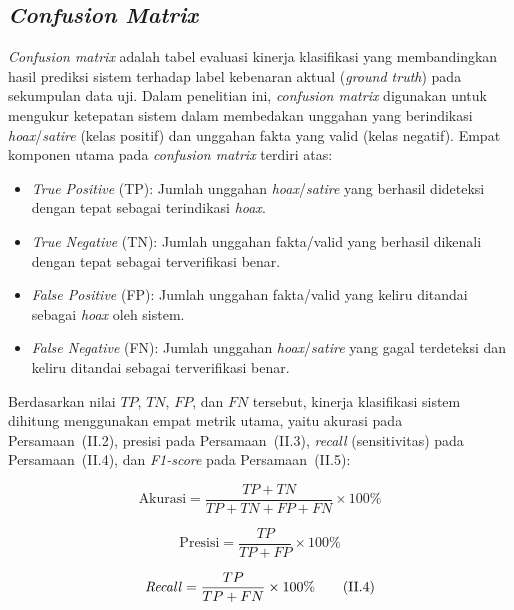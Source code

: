 \documentclass[12pt,a4paper,twoside]{report}
\begin{document}
\subsection{\textit{Confusion Matrix}}

\textit{Confusion matrix} adalah tabel evaluasi kinerja klasifikasi yang membandingkan hasil prediksi sistem terhadap label kebenaran aktual (\textit{ground truth}) pada sekumpulan data uji. Dalam penelitian ini, \textit{confusion matrix} digunakan untuk mengukur ketepatan sistem dalam membedakan unggahan yang berindikasi \textit{hoax}/\textit{satire} (kelas positif) dan unggahan fakta yang valid (kelas negatif). Empat komponen utama pada \textit{confusion matrix} terdiri atas:
\begin{itemize}[leftmargin=0.8cm,itemsep=2pt,topsep=2pt]
  \item \textit{True Positive} (TP): Jumlah unggahan \textit{hoax}/\textit{satire} yang berhasil dideteksi dengan tepat sebagai terindikasi \textit{hoax}.
  \item \textit{True Negative} (TN): Jumlah unggahan fakta/valid yang berhasil dikenali dengan tepat sebagai terverifikasi benar.
  \item \textit{False Positive} (FP): Jumlah unggahan fakta/valid yang keliru ditandai sebagai \textit{hoax} oleh sistem.
  \item \textit{False Negative} (FN): Jumlah unggahan \textit{hoax}/\textit{satire} yang gagal terdeteksi dan keliru ditandai sebagai terverifikasi benar.
\end{itemize}

Berdasarkan nilai $TP$, $TN$, $FP$, dan $FN$ tersebut, kinerja klasifikasi sistem dihitung menggunakan empat metrik utama, yaitu akurasi pada Persamaan~(II.2), presisi pada Persamaan~(II.3), \textit{recall} (sensitivitas) pada Persamaan~(II.4), dan \textit{F1-score} pada Persamaan~(II.5):

\begin{equation}
  \text{Akurasi} = \frac{TP + TN}{TP + TN + FP + FN} \times 100\%
  \tag{II.2}
\end{equation}

\begin{equation}
  \text{Presisi} = \frac{TP}{TP + FP} \times 100\%
  \tag{II.3}
\end{equation}

\begin{equation}
  \text{\textit{Recall}} = \frac{TP}{TP + FN} \times 100\%
  \tag{II.4}
\end{equation}
\end{document}
